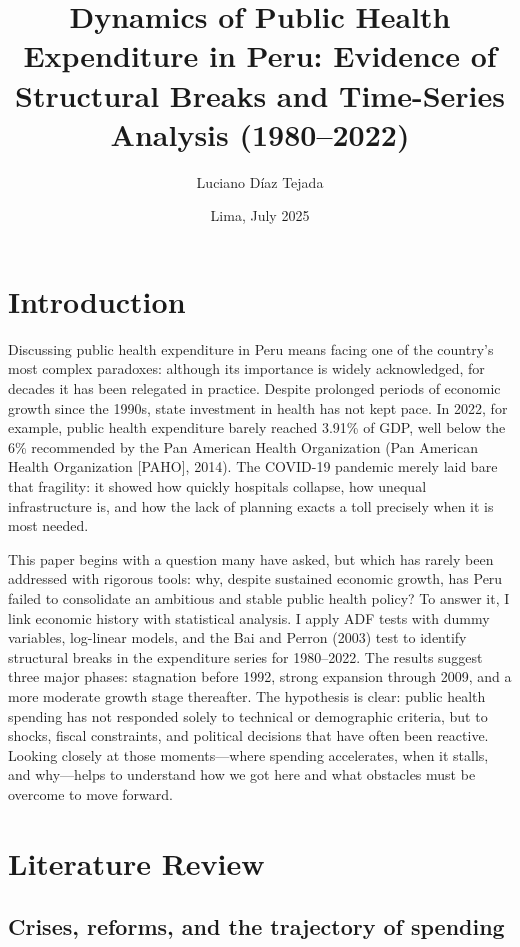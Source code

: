 \documentclass[12pt]{article}
\title{Dynamics of Public Health Expenditure in Peru: Evidence of Structural Breaks and Time-Series Analysis (1980–2022)}
\author{Luciano Díaz Tejada}
\date{Lima, July 2025}
\begin{document}
\maketitle
\section{Introduction}

Discussing public health expenditure in Peru means facing one of the country’s most complex paradoxes: although its importance is widely acknowledged, for decades it has been relegated in practice. Despite prolonged periods of economic growth since the 1990s, state investment in health has not kept pace. In 2022, for example, public health expenditure barely reached 3.91\% of GDP, well below the 6\% recommended by the Pan American Health Organization (Pan American Health Organization [PAHO], 2014). The COVID-19 pandemic merely laid bare that fragility: it showed how quickly hospitals collapse, how unequal infrastructure is, and how the lack of planning exacts a toll precisely when it is most needed.

This paper begins with a question many have asked, but which has rarely been addressed with rigorous tools: why, despite sustained economic growth, has Peru failed to consolidate an ambitious and stable public health policy? To answer it, I link economic history with statistical analysis. I apply ADF tests with dummy variables, log-linear models, and the Bai and Perron (2003) test to identify structural breaks in the expenditure series for 1980–2022. The results suggest three major phases: stagnation before 1992, strong expansion through 2009, and a more moderate growth stage thereafter. The hypothesis is clear: public health spending has not responded solely to technical or demographic criteria, but to shocks, fiscal constraints, and political decisions that have often been reactive. Looking closely at those moments—where spending accelerates, when it stalls, and why—helps to understand how we got here and what obstacles must be overcome to move forward.

\bigskip
\bigskip
\section{Literature Review}

\subsection{Crises, reforms, and the trajectory of spending}
\end{document}
